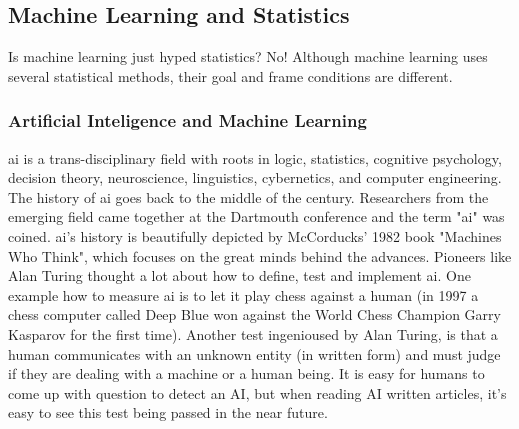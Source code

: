 

\subsection{Machine Learning and Statistics}

Is machine learning just hyped statistics? No! 
Although machine learning uses several statistical methods, their goal and frame conditions are different. 


\subsubsection{Artificial Inteligence and Machine Learning}
\Gls{ai} is a trans-disciplinary field with roots in logic, statistics, cognitive psychology, decision theory, neuroscience, linguistics, cybernetics, and computer engineering.\cite{howard2019artificial}
The history of \gls{ai} goes back to the middle of the  century. 
Researchers from the emerging field came together at the Dartmouth conference and the term "\gls{ai}" was coined\cite{McCarthy1955}. 
\Gls{ai}'s  history is beautifully depicted by McCorducks' 1982 book "Machines Who Think"\cite{McCorduck1982,Apter1982}, which focuses on the great minds behind the advances.
Pioneers like Alan Turing thought a lot about how to define, test and implement \gls{ai}\cite{howard2019artificial}. 
One example how to measure \gls{ai} is to let it play chess against a human\cite{Silver2017} 
(in 1997 a chess computer called Deep Blue won against the World Chess Champion Garry Kasparov for the first time\cite{Feng1999}).
Another test ingenioused by Alan Turing, is that a human communicates with an unknown entity (in written form) and must judge if they are dealing with a machine or a human being. 
It is easy for humans to come up with question to detect an AI, 
but when reading AI written articles\cite{gpt2020}, it's easy to see this test being passed in the near future. 

